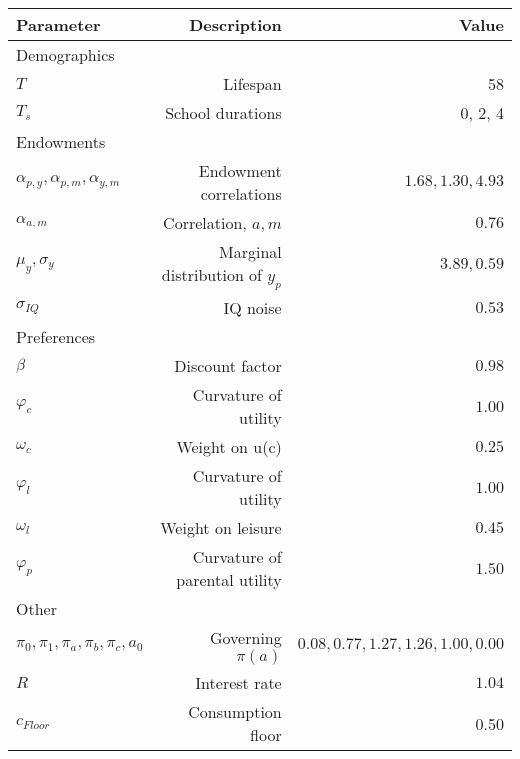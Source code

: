 \begin{tabular}{lrr}
\hline
Parameter & Description  & Value  \\
\hline
Demographics &   &   \\
$T$ & Lifespan  & 58  \\
$T_{s}$ & School durations  & 0, 2, 4  \\
Endowments &   &   \\
$\alpha_{p,y}, \alpha_{p,m}, \alpha_{y,m}$ & Endowment correlations  & $1.68, 1.30, 4.93$  \\
$\alpha_{a,m}$ & Correlation, $a,m$  & $0.76$  \\
$\mu_{y}, \sigma_{y}$ & Marginal distribution of $y_{p}$  & $3.89, 0.59$  \\
$\sigma_{IQ}$ & IQ noise  & $0.53$  \\
Preferences &   &   \\
$\beta$ & Discount factor  & $0.98$  \\
$\varphi_{c}$ & Curvature of utility  & $1.00$  \\
$\omega_{c}$ & Weight on u(c)  & $0.25$  \\
$\varphi_{l}$ & Curvature of utility  & $1.00$  \\
$\omega_{l}$ & Weight on leisure  & $0.45$  \\
$\varphi_{p}$ & Curvature of parental utility  & $1.50$  \\
Other &   &   \\
$\pi_{0}, \pi_{1}, \pi_{a}, \pi_{b}, \pi_{c}, a_{0}$ & Governing $\pi(a)$  & $0.08, 0.77, 1.27, 1.26, 1.00, 0.00$  \\
$R$ & Interest rate  & $1.04$  \\
$c_{Floor}$ & Consumption floor  & 0.50  \\
\hline
\end{tabular}%
